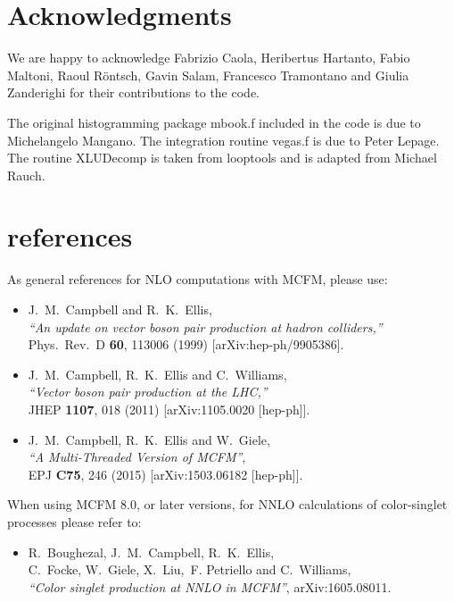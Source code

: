 \documentclass{article}
\begin{document}
{{{{{{\section*{Acknowledgments}
We are happy to acknowledge Fabrizio Caola, Heribertus Hartanto, Fabio
Maltoni, Raoul R{\"o}ntsch, Gavin Salam, Francesco Tramontano and
Giulia Zanderighi for their contributions to the code.

The original histogramming package mbook.f included in the code is due
to Michelangelo Mangano.  The integration routine vegas.f is due to
Peter Lepage.  The routine XLUDecomp is taken from looptools and is
adapted from Michael Rauch.



\appendix
\section{\MCFM references}
\label{MCFMrefs}

As general references for NLO computations with MCFM, please use:
\begin{itemize}
\item J.~M.~Campbell and R.~K.~Ellis, \\
  {\it ``An update on vector boson pair production at hadron colliders,''} \\
  Phys.\ Rev.\ D {\bf 60}, 113006 (1999)
  [arXiv:hep-ph/9905386].
\item J.~M.~Campbell, R.~K.~Ellis and C.~Williams, \\
  {\it ``Vector boson pair production at the LHC,''} \\
  JHEP {\bf 1107}, 018 (2011)
  [arXiv:1105.0020 [hep-ph]]. 
\item J.~M.~Campbell, R.~K.~Ellis and W.~Giele, \\
  {\it ``A Multi-Threaded Version of MCFM''}, \\
    EPJ {\bf C75}, 246 (2015)
    [arXiv:1503.06182 [hep-ph]].

\end{itemize}

When using MCFM 8.0, or later versions, for NNLO calculations of color-singlet
processes please refer to:
\begin{itemize}
\item 
  R.~Boughezal, J.~M.~Campbell, R.~K.~Ellis, \\
   C.~Focke, W.~Giele, X.~Liu,~F. Petriello and  C.~Williams, \\
  {\it ``Color singlet production at NNLO in MCFM''},
  arXiv:1605.08011.
\end{itemize}

}}}}}}
\end{document}
